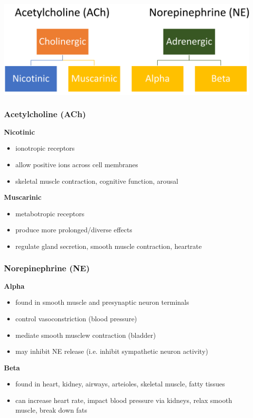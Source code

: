 \documentclass[11pt,fleqn]{book}
\begin{document}
\begin{center}
    \includegraphics[width=0.65\linewidth]{Pictures/Screenshot 2024-03-06 204921.png}
\end{center}

\subsubsection{Acetylcholine (ACh)}

\textbf{Nicotinic}
\begin{itemize}
    \item ionotropic receptors
    \item allow positive ions across cell membranes 
    \item skeletal muscle contraction, cognitive function, arousal
\end{itemize}

\textbf{Muscarinic}
\begin{itemize}
    \item metabotropic receptors
    \item produce more prolonged/diverse effects
    \item regulate gland secretion, smooth muscle contraction, heartrate
\end{itemize}

\subsubsection{Norepinephrine (NE)}

\textbf{Alpha}
\begin{itemize}
    \item found in smooth muscle and presynaptic neuron terminals
    \item control vasoconstriction (blood pressure)
    \item mediate smooth musclew contraction (bladder)
    \item may inhibit NE release (i.e. inhibit sympathetic neuron activity)
\end{itemize}

\textbf{Beta}
\begin{itemize}
    \item found in heart, kidney, airways, arteioles, skeletal muscle, fatty tissues
    \item can increase heart rate, impact blood pressure via kidneys, relax smooth muscle, break down fats
\end{itemize}
\end{document}
